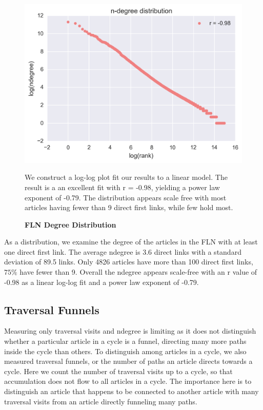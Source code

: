 \documentclass[pre,twocolumn,twoside,superscriptaddress,floatfix, aps, 10pt]{revtex4-1}
\begin{document}
\begin{figure}[tp!]
  \centering	
  \includegraphics[width=\columnwidth]{graphics/ndegree_loglog.png}
  \caption{
    \textbf{FLN Degree Distribution}
  }
  We construct a log-log plot fit our results to a linear model. The result is a 
  an excellent fit with r = -0.98, yielding a power law exponent of -0.79. 
  The distribution appears scale free with most articles having fewer than 9 
  direct first links, while few hold most.
  \label{fig:degree distribution}

\end{figure}
As a distribution, we examine the degree of the articles in the FLN with at least
one direct first link. The average ndegree 
is 3.6 direct links with a standard deviation of 89.5 links.
Only 4826 articles have more than 100 direct first links, $75\%$ have fewer than 
9. Overall the ndegree appears scale-free with an r value of -0.98 as a linear log-log fit and a power law exponent of -0.79. 



\subsection{Traversal Funnels}

Measuring only traversal visits and ndegree is limiting as it does not distinguish whether a particular article in a cycle 
is a funnel, directing many more paths inside the cycle than others. 
To distinguish among articles in a cycle, we also measured traversal funnels, or the number of 
paths an article directs towards a cycle. Here we count the number of traversal visits up to a cycle, 
so that accumulation does not flow to all articles in a cycle.
The importance here is to distinguish an article that happens to be connected to another article with many traversal visits 
from an article directly funneling many paths.
\end{document}
